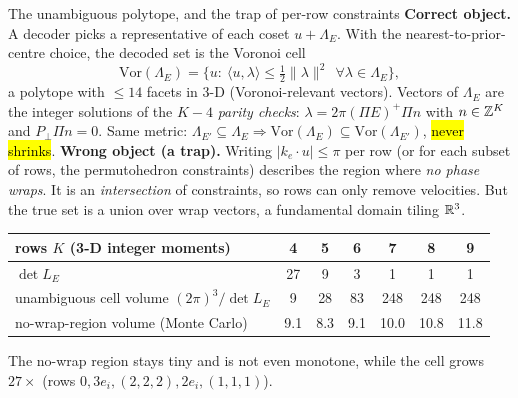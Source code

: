 \begin{frame}{The unambiguous polytope, and the trap of per-row constraints}
\footnotesize
\textbf{Correct object.} A decoder picks a representative of each coset $u+\Lambda_E$. With the nearest-to-prior-centre choice, the decoded set is the Voronoi cell
\[ \mathrm{Vor}(\Lambda_E)=\{u:\ \langle u,\lambda\rangle\le\tfrac12\|\lambda\|^2\ \ \forall\lambda\in\Lambda_E\}, \]
a polytope with $\le14$ facets in 3-D (Voronoi-relevant vectors). Vectors of $\Lambda_E$ are the integer solutions of the $K-4$ \emph{parity checks}: $\lambda=2\pi(\Pi E)^{+}\Pi n$ with $n\in\mathbb Z^K$ and $P_\perp\Pi n=0$. Same metric: $\Lambda_{E'}\subseteq\Lambda_E\Rightarrow\mathrm{Vor}(\Lambda_E)\subseteq\mathrm{Vor}(\Lambda_{E'})$, \hl{never shrinks}.
\pause
\medskip
\textbf{Wrong object (a trap).} Writing $|k_e\!\cdot\!u|\le\pi$ per row (or for each subset of rows, the permutohedron constraints) describes the region where \emph{no phase wraps}. It is an \emph{intersection} of constraints, so rows can only remove velocities. But the true set is a union over wrap vectors, a fundamental domain tiling $\mathbb R^3$.
\medskip
\begin{center}\scriptsize
\begin{tabular}{@{}lcccccc@{}}\toprule
rows $K$ (3-D integer moments) & 4 & 5 & 6 & 7 & 8 & 9\\\midrule
$\det L_E$ & 27 & 9 & 3 & 1 & 1 & 1\\
unambiguous cell volume $(2\pi)^3/\det L_E$ & 9 & 28 & 83 & 248 & 248 & 248\\
no-wrap-region volume (Monte Carlo) & 9.1 & 8.3 & 9.1 & 10.0 & 10.8 & 11.8\\\bottomrule
\end{tabular}
\end{center}
\vspace{-1mm}
The no-wrap region stays tiny and is not even monotone, while the cell grows $27\times$ (rows $0,3e_i,(2,2,2),2e_i,(1,1,1)$).
\end{frame}

